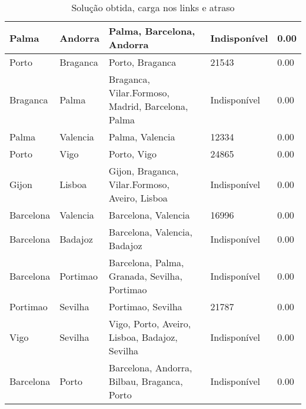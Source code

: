 \begin{table}[!htb]
{\begin{tabular}{|l|l|l|l|l|}
Palma & Andorra & Palma, Barcelona, Andorra & Indisponível & 0.00 \\ \hline
Porto & Braganca & Porto, Braganca & 21543 & 0.00 \\ \hline
Braganca & Palma & Braganca, Vilar.Formoso, Madrid, Barcelona, Palma & Indisponível & 0.00 \\ \hline
Palma & Valencia & Palma, Valencia & 12334 & 0.00 \\ \hline
Porto & Vigo & Porto, Vigo & 24865 & 0.00 \\ \hline
Gijon & Lisboa & Gijon, Braganca, Vilar.Formoso, Aveiro, Lisboa & Indisponível & 0.00 \\ \hline
Barcelona & Valencia & Barcelona, Valencia & 16996 & 0.00 \\ \hline
Barcelona & Badajoz & Barcelona, Valencia, Badajoz & Indisponível & 0.00 \\ \hline
Barcelona & Portimao & Barcelona, Palma, Granada, Sevilha, Portimao & Indisponível & 0.00 \\ \hline
Portimao & Sevilha & Portimao, Sevilha & 21787 & 0.00 \\ \hline
Vigo & Sevilha & Vigo, Porto, Aveiro, Lisboa, Badajoz, Sevilha & Indisponível & 0.00 \\ \hline
Barcelona & Porto & Barcelona, Andorra, Bilbau, Braganca, Porto & Indisponível & 0.00 \\ \hline
\end{tabular}}
\caption[]{Solução obtida, carga nos links e atraso}
\end{table}


